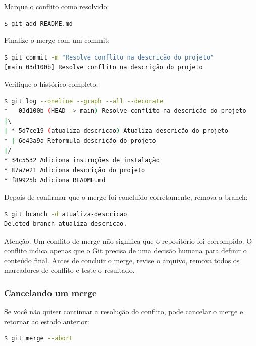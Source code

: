 \documentclass[12pt,a4paper]{article}
\begin{document}
Marque o conflito como resolvido: 

\begin{lstlisting}[language=bash]
$ git add README.md
\end{lstlisting}

Finalize o merge com um commit:

\begin{lstlisting}[language=bash]
$ git commit -m "Resolve conflito na descrição do projeto"
[main 03d100b] Resolve conflito na descrição do projeto
\end{lstlisting}

Verifique o histórico completo: 

\begin{lstlisting}[language=bash]
$ git log --oneline --graph --all --decorate
*   03d100b (HEAD -> main) Resolve conflito na descrição do projeto
|\  
| * 5d7ce19 (atualiza-descricao) Atualiza descrição do projeto
* | 6e43a9a Reformula descrição do projeto
|/  
* 34c5532 Adiciona instruções de instalação
* 87a7e21 Adiciona descrição do projeto
* f89925b Adiciona README.md
\end{lstlisting}

Depois de confirmar que o merge foi concluído corretamente, remova a branch:

\begin{lstlisting}[language=bash]
$ git branch -d atualiza-descricao
Deleted branch atualiza-descricao.
\end{lstlisting} 

\begin{question}{Atenção.}
\footnotesize Um conflito de merge não significa que o repositório foi corrompido. O conflito indica apenas que o Git precisa de uma decisão humana para definir o conteúdo final. Antes de concluir o merge, revise o arquivo, remova todos os marcadores de conflito e teste o resultado.
\end{question}

\subsubsection{Cancelando um merge}

Se você não quiser continuar a resolução do conflito, pode cancelar o merge e retornar ao estado anterior:

\begin{lstlisting}[language=bash]
$ git merge --abort
\end{lstlisting} 
\end{document}
